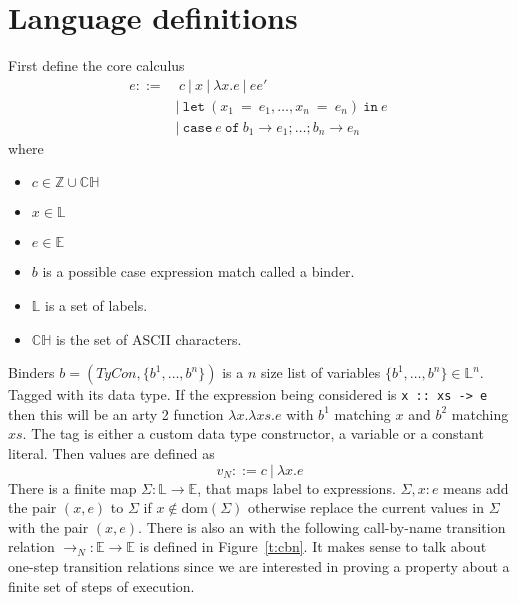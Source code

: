 \documentclass[float=false, crop=false]{standalone}
\numberwithin{subcase}{case}
\newcommand{\tcbn}{\rightarrow_N}
\begin{document}
\section{Language definitions}

First define the core calculus 
\begin{align*}
  e ::=&\ c\ |\ x\ |\ \lambda x.e\ |\ e e'\
  \\ &|\ \mathtt{let}\ (x_1\ \mathtt{=}\ e_1,\dotsc, x_n\ \mathtt{=}\ e_n)\ \mathtt{in}\ e\
  \\ &|\ \mathtt{case}\ e\ \mathtt{of}\ b_1 \rightarrow e_1; \dots; b_n \rightarrow e_n
\end{align*} 
where 
\begin{itemize}
  \item $c\in\mathbb{Z}\cup\mathbb{CH}$ 
  \item $x\in \mathbb{L}$
  \item $e\in\mathbb{E}$ 
  \item $b$ is a possible case expression match called a binder.
  \item $\mathbb{L}$ is a set of labels.
  \item $\mathbb{CH}$ is the set of ASCII characters.
\end{itemize} 

Binders $b = (\mathit{TyCon},\{b^1,\dotsc,b^n\})$ is a $n$ size list of variables 
\mbox{$\{b^1,\dotsc,b^n \}\in \mathbb{L}^n$}. Tagged with its data type. If the expression
being considered is \mbox{\texttt{x :: xs -> e}} then this will be an arty 2 function
$\lambda x.\lambda \mathit{xs}. e$ with $b^1$ matching $x$ and $b^2$ matching $xs$.
The tag is either a custom data type constructor, a variable or a constant literal. 
Then values are defined as \[v_N ::= c\ |\ \lambda x.e \]
There is a finite map $\Sigma : \mathbb{L} 
\rightarrow \mathbb{E}$, that maps label to expressions. 
$\Sigma,x:e$ means add the pair $(x,e)$ to $\Sigma$ if $x \not\in\text{dom}(\Sigma)$
otherwise replace the current values in $\Sigma$ with the pair $(x,e)$.
There is also an with the following call-by-name transition relation 
\mbox{$\tcbn : \mathbb{E} \rightarrow \mathbb{E}$} is defined in Figure~\ref{t:cbn}. It makes sense to talk about one-step transition relations since
we are interested in proving a property about
a finite set of steps of execution.
\end{document}
